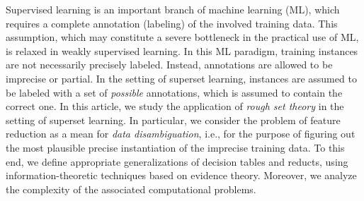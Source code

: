 
Supervised learning is an important branch of machine learning (ML), which requires a complete annotation (labeling) of the involved training data. This assumption, which may constitute a severe bottleneck in the practical use of ML, is relaxed in weakly supervised learning. In this ML paradigm, training instances are not necessarily precisely labeled. Instead, annotations are allowed to be imprecise or partial. In the setting of superset learning,  instances are assumed to be labeled with a set of \emph{possible} annotations, which is assumed to contain the correct one.
In this article, we study the application of \emph{rough set theory} in the setting of superset learning. In particular, we consider the problem of feature reduction as a mean for \emph{data disambiguation}, i.e., for the purpose of figuring out the most plausible precise instantiation of the imprecise training data.
 To this end, we define appropriate generalizations of decision tables and reducts, using information-theoretic techniques based on evidence theory. Moreover, we analyze the complexity of the associated computational problems.


